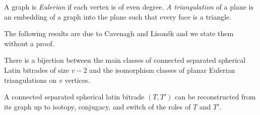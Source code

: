 
\begin{defn}
A graph is \emph{Eulerian} if each vertex is of even degree. \emph{A triangulation} of a plane is an embedding of a graph into the plane such that every face is a triangle.
\end{defn}

The following results are due to Cavenagh and Lisoněk \cite{CavenaghLisonek08} and we state them without a proof.

\begin{thm}
\label{thm:connected-spherical-separated}
There is a bijection between the main classes of connected separated spherical Latin bitrades of size $v-2$ and the isomorphism classes of planar Eulerian triangulations on $v$ vertices.
\end{thm}%

\begin{cor}
\label{cor:connected-spherical-separated}
A connected separated spherical latin bitrade $(T,T')$ can be reconstructed from its graph up to isotopy, conjugacy, and switch of the roles of $T$ and $T'$.
\end{cor}%



